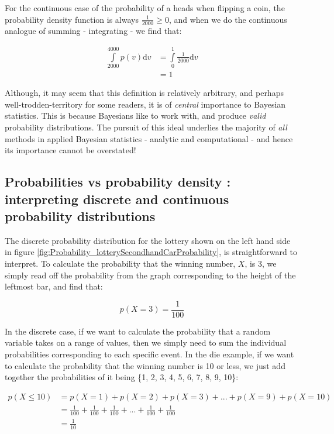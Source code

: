 \documentclass[11pt,fullpage]{book}
\begin{document}
For the continuous case of the probability of a heads when flipping a coin, the probability density function is always $\frac{1}{2000}\geq 0$, and when we do the continuous analogue of summing - integrating - we find that:

\begin{equation}
\begin{align}
\int\limits_{2000}^{4000} p(v) \mathrm{d}v &= \int\limits_{0}^{1} \frac{1}{2000} \mathrm{d}v\\
&= 1
\end{align}
\end{equation}

Although, it may seem that this definition is relatively arbitrary, and perhaps well-trodden-territory for some readers, it is of \textit{central} importance to Bayesian statistics. This is because Bayesians like to work with, and produce \textit{valid} probability distributions. The pursuit of this ideal underlies the majority of \textit{all} methods in applied Bayesian statistics - analytic and computational - and hence its importance cannot be overstated!

\subsection{Probabilities vs probability density : interpreting discrete and continuous probability distributions}\label{sec:Probability_densityVsMassFunctions}
The discrete probability distribution for the lottery shown on the left hand side in figure \ref{fig:Probability_lotterySecondhandCarProbability}, is straightforward to interpret. To calculate the probability that the winning number, $X$, is 3, we simply read off the probability from the graph corresponding to the height of the leftmost bar, and find that:

\begin{equation}
p(X=3)= \frac{1}{100}
\end{equation}

In the discrete case, if we want to calculate the probability that a random variable takes on a range of values, then we simply need to sum the individual probabilities corresponding to each specific event. In the die example, if we want to calculate the probability that the winning number is 10 or less, we just add together the probabilities of it being \{1, 2, 3, 4, 5, 6, 7, 8, 9, 10\}:

\begin{equation}
\begin{align}
p(X\leq 10) &= p(X=1) + p(X=2) + p(X=3) + ... + p(X=9) + p(X=10)\\
&= \frac{1}{100} + \frac{1}{100} + \frac{1}{100} + ... + \frac{1}{100} + \frac{1}{100}\\
&= \frac{1}{10}
\end{align}
\end{equation}
\end{document}
